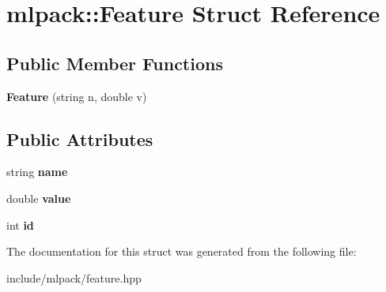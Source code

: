 \hypertarget{structmlpack_1_1_feature}{
\section{mlpack::Feature Struct Reference}
\label{structmlpack_1_1_feature}
}
\subsection*{Public Member Functions}
\begin{DoxyCompactItemize}
\item 
\hypertarget{structmlpack_1_1_feature_af731a0d0274d23be34feeadbbecbf5fb}{
{\bfseries Feature} (string n, double v)}
\label{structmlpack_1_1_feature_af731a0d0274d23be34feeadbbecbf5fb}

\end{DoxyCompactItemize}
\subsection*{Public Attributes}
\begin{DoxyCompactItemize}
\item 
\hypertarget{structmlpack_1_1_feature_a0e4f86f38cc28733574e4a8a60d71de8}{
string {\bfseries name}}
\label{structmlpack_1_1_feature_a0e4f86f38cc28733574e4a8a60d71de8}

\item 
\hypertarget{structmlpack_1_1_feature_af60cfe02f10b9555df297816e45fb267}{
double {\bfseries value}}
\label{structmlpack_1_1_feature_af60cfe02f10b9555df297816e45fb267}

\item 
\hypertarget{structmlpack_1_1_feature_a60a991b860b743263e0b4ce1fe57e093}{
int {\bfseries id}}
\label{structmlpack_1_1_feature_a60a991b860b743263e0b4ce1fe57e093}

\end{DoxyCompactItemize}


The documentation for this struct was generated from the following file:\begin{DoxyCompactItemize}
\item 
include/mlpack/feature.hpp\end{DoxyCompactItemize}
